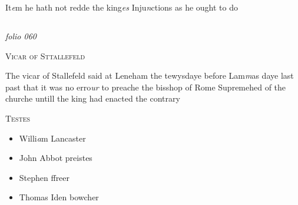 \documentclass[12pt, a4paper]{book}
\begin{document}
	
			
	
		\ifthenelse{\isodd{\thepage}}
		{\reversemarginpar}
		{\normalmarginpar}
		It\textit{e}m he hath not redde the king\textit{es} Inju\textit{n}ctions as he ought to do



\dotfill
						\newpage {} \subsection*{}

\textit{folio 060}


               
                  
				\begin{center}  {\scshape Vicar of Sttallefeld}  \end{center}
			
               	
               		
				\marginpar[\vspace{0.5cm}{\textcolor{Gray}{n}}]{}
			
               		
				\marginpar[\vspace{0.5cm}{\textcolor{Gray}{the busshope of Rome}}]{}
			
               		
		\ifthenelse{\isodd{\thepage}}
		{\reversemarginpar}
		{\normalmarginpar}
		The vicar of Stallefeld said at Leneham
  the tewysdaye before Lam\textit{m}as daye last past that
               			it was no erro\textit{ur} to preache the bisshop of Rome
 Supremehed of the churche untill the king had
 enacted the contrary
               	

	\begin{center} {\scshape Testes} \end{center}\begin{itemize}
 \item[]Willi\textit{a}m Lancaster
		\item[]John Abbot preistes
		\item[]Stephen ffreer
		\item[]Thomas Iden bowcher
	\end{itemize}


				\marginpar[\vspace{0.5cm}{\textcolor{Gray}{n}}]{}
			 

            
            
\end{document}
